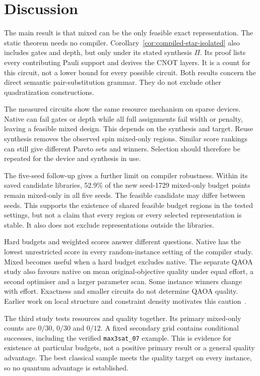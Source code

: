 \documentclass[a4paper,onecolumn,11pt,unpublished]{quantumarticle}
\theoremstyle{remark}
\begin{document}
\section{Discussion}
\label{sec:discussion}\label{sec:conclusion}\label{sec:discussion-search-scope}
The main result is that mixed can be the only feasible exact representation.
The static theorem needs no compiler. Corollary~\ref{cor:compiled-star-isolated}
also includes gates and depth, but only under its stated synthesis $\Pi$.
Its proof lists every contributing Pauli support and derives the CNOT layers.
It is a count for this circuit, not a lower bound for every possible circuit.
Both results concern the direct semantic pair-substitution grammar.
They do not exclude other quadratization constructions.

The measured circuits show the same resource mechanism on sparse devices.
Native can fail gates or depth while all full assignments fail width or
penalty, leaving a feasible mixed design. This depends on the synthesis
and target. Reuse synthesis removes the observed spin mixed-only regions.
Similar score rankings can still give different Pareto sets and winners.
Selection should therefore be repeated for the device and synthesis in use.


The five-seed follow-up gives a further limit on compiler robustness.
Within its saved candidate libraries, 52.9\% of the new seed-1729
mixed-only budget points remain mixed-only in all five seeds.
The feasible candidate may differ between seeds. This supports the
existence of shared feasible budget regions in the tested settings,
but not a claim that every region or every selected representation is
stable. It also does not exclude representations outside the libraries.

Hard budgets and weighted scores answer different questions. Native has the
lowest unrestricted score in every random-instance setting of the compiler
study. Mixed becomes useful when a hard budget excludes native.
The separate QAOA study also favours native on mean original-objective
quality under equal effort, a second optimiser and a larger parameter scan.
Some instance winners change with effort. Exactness and smaller circuits
do not determine QAOA quality. Earlier work on local structure and constraint
density motivates this caution~\cite{WangMaxCut2018,FarhiLocal2020,Akshay2020}.

The third study tests resources and quality together. Its primary mixed-only
counts are $0/30$, $0/30$ and $0/12$. A fixed secondary grid contains conditional
successes, including the verified \texttt{max3sat\_07} example. This is evidence
for existence at particular budgets, not a positive primary result or a
general quality advantage. The best classical sample meets the quality
target on every instance, so no quantum advantage is established.
\end{document}
